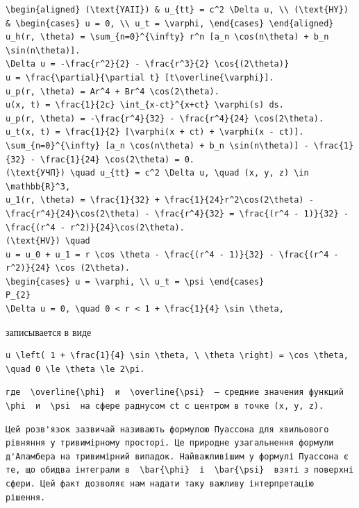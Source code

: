 \documentclass[
  ukrainian,
]{article}
\begin{document}
\begin{verbatim}
\begin{aligned} (\text{YAII}) & u_{tt} = c^2 \Delta u, \\ (\text{HY}) & \begin{cases} u = 0, \\ u_t = \varphi, \end{cases} \end{aligned}
u_h(r, \theta) = \sum_{n=0}^{\infty} r^n [a_n \cos(n\theta) + b_n \sin(n\theta)].
\Delta u = -\frac{r^2}{2} - \frac{r^3}{2} \cos{(2\theta)}
u = \frac{\partial}{\partial t} [t\overline{\varphi}].
u_p(r, \theta) = Ar^4 + Br^4 \cos(2\theta).
u(x, t) = \frac{1}{2c} \int_{x-ct}^{x+ct} \varphi(s) ds.
u_p(r, \theta) = -\frac{r^4}{32} - \frac{r^4}{24} \cos(2\theta).
u_t(x, t) = \frac{1}{2} [\varphi(x + ct) + \varphi(x - ct)].
\sum_{n=0}^{\infty} [a_n \cos(n\theta) + b_n \sin(n\theta)] - \frac{1}{32} - \frac{1}{24} \cos(2\theta) = 0.
(\text{УЧП}) \quad u_{tt} = c^2 \Delta u, \quad (x, y, z) \in \mathbb{R}^3,
u_1(r, \theta) = \frac{1}{32} + \frac{1}{24}r^2\cos(2\theta) - \frac{r^4}{24}\cos(2\theta) - \frac{r^4}{32} = \frac{(r^4 - 1)}{32} - \frac{(r^4 - r^2)}{24}\cos(2\theta).
(\text{HV}) \quad
u = u_0 + u_1 = r \cos \theta - \frac{(r^4 - 1)}{32} - \frac{(r^4 - r^2)}{24} \cos (2\theta).
\begin{cases} u = \varphi, \\ u_t = \psi \end{cases}
P_{2}
\Delta u = 0, \quad 0 < r < 1 + \frac{1}{4} \sin \theta,
\end{verbatim}

записывается в виде

\begin{verbatim}
u \left( 1 + \frac{1}{4} \sin \theta, \ \theta \right) = \cos \theta, \quad 0 \le \theta \le 2\pi.
\end{verbatim}

\begin{verbatim}
где  \overline{\phi}  и  \overline{\psi}  — средние значения функций  \phi  и  \psi  на сфере раднусом ct с центром в точке (x, y, z).
\end{verbatim}

\begin{verbatim}
Цей розв'язок зазвичай називають формулою Пуассона для хвильового рівняння у тривимірному просторі. Це природне узагальнення формули д'Аламбера на тривимірний випадок. Найважливішим у формулі Пуассона є те, що обидва інтеграли в  \bar{\phi}  і  \bar{\psi}  взяті з поверхні сфери. Цей факт дозволяє нам надати таку важливу інтерпретацію рішення.
\end{verbatim}
\end{document}
